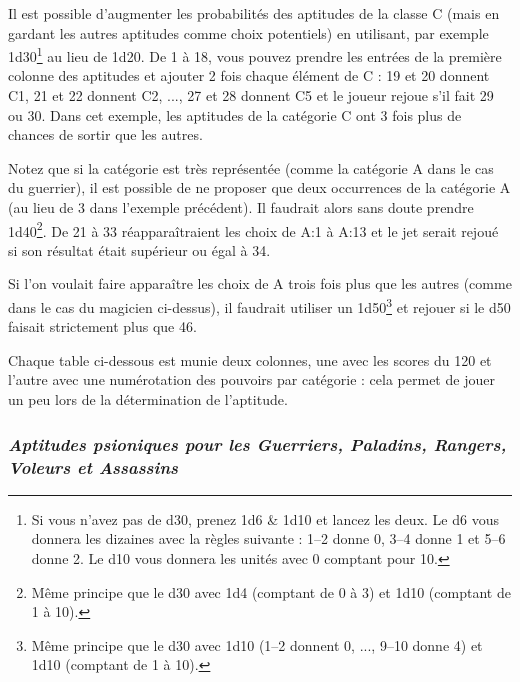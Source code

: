 \bigskip

Il est possible d'augmenter les probabilités des aptitudes de la classe C (mais en gardant les autres aptitudes comme choix potentiels) en utilisant, par exemple 1d30\footnote{Si vous n'avez pas de d30, prenez 1d6 \& 1d10 et lancez les deux. Le d6 vous donnera les dizaines avec la règles suivante : 1--2 donne 0, 3--4 donne 1 et 5--6 donne 2. Le d10 vous donnera les unités avec 0 comptant pour 10.} au lieu de 1d20. De 1 à 18, vous pouvez prendre les entrées de la première colonne des aptitudes et ajouter 2 fois chaque élément de C : 19 et 20 donnent C1, 21 et 22 donnent C2, ..., 27 et 28 donnent C5 et le joueur rejoue s'il fait 29 ou 30. Dans cet exemple, les aptitudes de la catégorie C ont 3 fois plus de chances de sortir que les autres.

\bigskip

Notez que si la catégorie est très représentée (comme la catégorie A dans le cas du guerrier), il est possible de ne proposer que deux occurrences de la catégorie A (au lieu de 3 dans l'exemple précédent). Il faudrait alors sans doute prendre 1d40\footnote{Même principe que le d30 avec 1d4 (comptant de 0 à 3) et 1d10 (comptant de 1 à 10).}. De 21 à 33 réapparaîtraient les choix de A:1 à A:13 et le jet serait rejoué si son résultat était supérieur ou égal à 34.

\bigskip

Si l'on voulait faire apparaître les choix de A trois fois plus que les autres (comme dans le cas du magicien ci-dessus), il faudrait utiliser un 1d50\footnote{Même principe que le d30 avec 1d10 (1--2 donnent 0, ..., 9--10 donne 4) et 1d10 (comptant de 1 à 10).} et rejouer si le d50 faisait strictement plus que 46.

\bigskip

Chaque table ci-dessous est munie deux colonnes, une avec les scores du 120 et l'autre avec une numérotation des pouvoirs par catégorie : cela permet de jouer un peu lors de la détermination de l'aptitude.

\newpage
\subsubsection*{\textit{Aptitudes psioniques pour les Guerriers, Paladins, Rangers, Voleurs et Assassins}}

